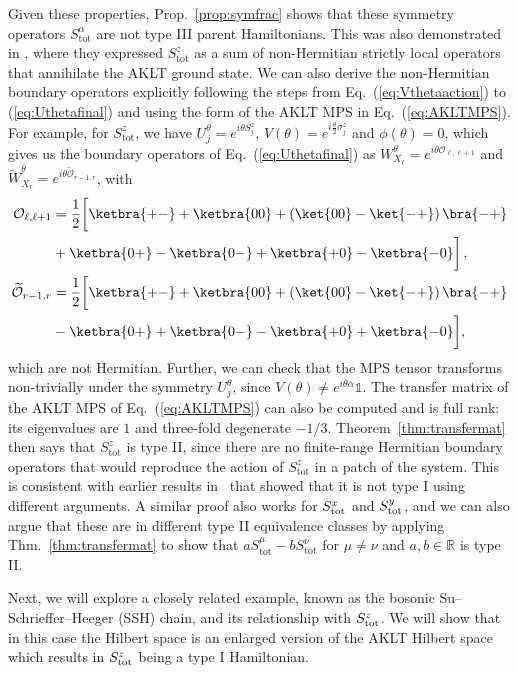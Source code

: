 \documentclass[prx,letterpaper,aps,superscriptaddress,floatfix,twocolumn,nofootinbib]{revtex4-2}
\theoremstyle{definition}
\newcommand{\tot}{\text{tot}}
\begin{document}
%
Given these properties, Prop.~\ref{prop:symfrac} shows that these symmetry operators $S^\alpha_{\tot}$ are not type III parent Hamiltonians.
%
This was also demonstrated in \cite{wang2024generalizedspinhelixstates}, where they expressed $S^z_{\tot}$ as a sum of non-Hermitian strictly local operators that annihilate the AKLT ground state. 
%
We can also derive the non-Hermitian boundary operators explicitly following the steps from Eq.~(\ref{eq:Vthetaaction}) to (\ref{eq:Uthetafinal}) and using the form of the AKLT MPS in Eq.~(\ref{eq:AKLTMPS}).
%
For example, for $S^z_{\tot}$, we have $U^\theta_j = e^{i \theta S^z_j}$, $V(\theta)  = e^{i \frac{\theta}{2}\sigma^z_j}$ and $\phi(\theta) = 0$, which gives us the boundary operators of Eq.~(\ref{eq:Uthetafinal}) as $ W^\theta_{X_\ell} =e^{i\theta \mathcal{O}_{\ell,\ell+1}}$ and $\widetilde{W}^\theta_{X_r}=e^{i\theta\mathcal{\widetilde{O}}_{r-1,r}}$, with
\begin{align*}
    \mathcal{O}_{\ell,\ell+1}
    &=\frac{1}{2}\bigg[\ketbra{+-}+\ketbra{00}+\left(\ket{00}-\ket{-+}\right)\bra{-+}\\
    &+\ketbra{0+}-\ketbra{0-}+\ketbra{+0}-\ketbra{-0}\bigg]\,,\\
    \mathcal{\widetilde{O}}_{r-1,r}
    &=\frac{1}{2}\bigg[\ketbra{+-}+\ketbra{00}+\left(\ket{00}-\ket{-+}\right)\bra{-+}\\
    &-\ketbra{0+}+\ketbra{0-}-\ketbra{+0}+\ketbra{-0}\bigg],
\end{align*}
which are not Hermitian.
%
Further, we can check that the MPS tensor transforms non-trivially under the symmetry $U^\theta_j$, since $V(\theta) \neq e^{i\theta\alpha}\mathds{1}$.
%
The transfer matrix of the AKLT MPS of Eq.~(\ref{eq:AKLTMPS}) can also be computed and is full rank: its eigenvalues are $1$ and three-fold degenerate $-1/3$.
%
Theorem~\ref{thm:transfermat} then says that $S^z_{\tot}$ is type II, since there are no finite-range Hermitian boundary operators that would reproduce the action of $S^z_{\tot}$ in a patch of the system.
%
This is consistent with earlier results in~\cite{moudgalya2023exhaustive} that showed that it is not type I using different arguments.
%
A similar proof also works for $S^x_{\rm tot}$ and $S^y_{\rm tot}$, and we can also argue that these are in different type II equivalence classes by applying Thm.~\ref{thm:transfermat} to show that $a S^\mu_{\tot} - b S^{\nu}_{\tot}$ for $\mu \neq \nu$ and $a, b \in \mathbb{R}$ is type II.
%

%
Next, we will explore a closely related example, known as the bosonic Su–Schrieffer–Heeger (SSH) chain, and its relationship with $S_{\rm tot}^z$. We will show that in this case the Hilbert space is an enlarged version of the AKLT Hilbert space which results in $S_{\rm tot}^z$ being a type I Hamiltonian.
%
\end{document}
